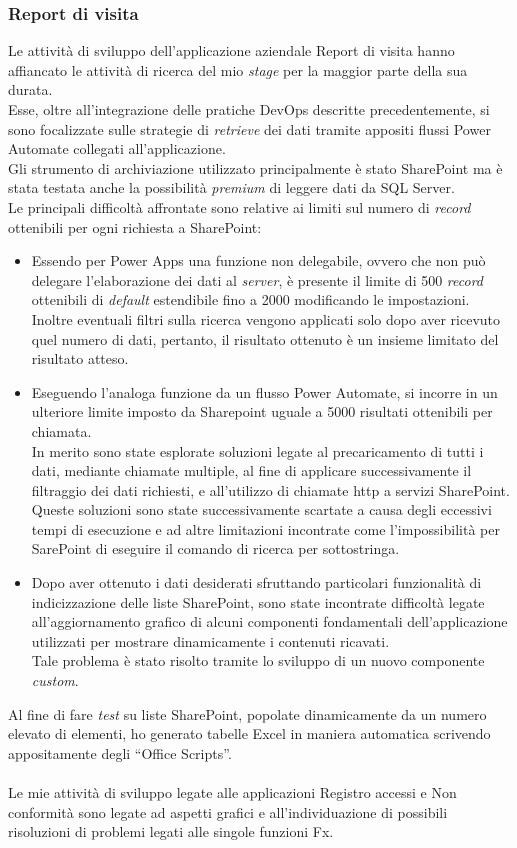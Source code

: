 \subsubsection*{Report di visita}
Le attività di sviluppo dell'applicazione aziendale Report di visita hanno affiancato le attività di ricerca del mio \emph{stage} per la maggior parte della sua durata.\\
Esse, oltre all'integrazione delle pratiche \gls{DevOps} descritte precedentemente, si sono focalizzate sulle strategie di \emph{retrieve} dei dati tramite appositi flussi Power Automate collegati all'applicazione.\\
Gli strumento di archiviazione utilizzato principalmente è stato SharePoint ma è stata testata anche la possibilità \emph{premium} di leggere dati da SQL Server.\\
Le principali difficoltà affrontate sono relative ai limiti sul numero di \emph{record} ottenibili per ogni richiesta a SharePoint:
\begin{itemize}
    \item Essendo per Power Apps una funzione non delegabile, ovvero che non può delegare l'elaborazione dei dati al \emph{server}, è presente il limite di 500 \emph{record} ottenibili di \emph{default} estendibile fino a 2000 modificando le impostazioni. Inoltre eventuali filtri sulla ricerca vengono applicati solo dopo aver ricevuto quel numero di dati, pertanto, il risultato ottenuto è un insieme limitato del risultato atteso.
    \item Eseguendo l'analoga funzione da un flusso Power Automate, si incorre in un ulteriore limite imposto da Sharepoint uguale a 5000 risultati ottenibili per chiamata.\\
    In merito sono state esplorate soluzioni legate al precaricamento di tutti i dati, mediante chiamate multiple, al fine di applicare successivamente il filtraggio dei dati richiesti, e all'utilizzo di chiamate \gls{http} a servizi SharePoint. Queste soluzioni sono state successivamente scartate a causa degli eccessivi tempi di esecuzione e ad altre limitazioni incontrate come l'impossibilità per SarePoint di eseguire il comando di ricerca per sottostringa.
    \item Dopo aver ottenuto i dati desiderati sfruttando particolari funzionalità di indicizzazione delle liste SharePoint, sono state incontrate difficoltà legate all'aggiornamento grafico di alcuni componenti fondamentali dell'applicazione utilizzati per mostrare dinamicamente i contenuti ricavati.\\
    Tale problema è stato risolto tramite lo sviluppo di un nuovo componente \emph{custom}.  
\end{itemize}
Al fine di fare \emph{test} su liste SharePoint, popolate dinamicamente da un numero elevato di elementi, ho generato tabelle Excel in maniera automatica scrivendo appositamente degli “Office Scripts”.\\\\
Le mie attività di sviluppo legate alle applicazioni Registro accessi e Non conformità sono legate ad aspetti grafici e all'individuazione di possibili risoluzioni di problemi legati alle singole funzioni Fx. 

